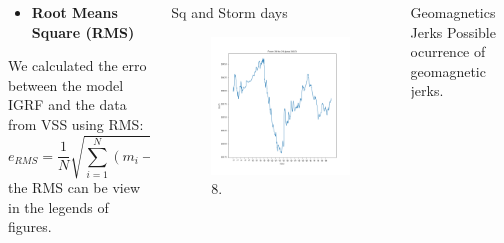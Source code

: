 \documentclass[final,t]{beamer}
\begin{document}
\begin{columns}[t]
\begin{column}{.66\linewidth}
\begin{columns}
\begin{column}{.31\linewidth}
\begin{block}{}
\begin{itemize}
\justifying
		\item \bf{Root Means Square (RMS)}
\end{itemize}
We calculated the erro between the model IGRF and the data from VSS using RMS:
\[e_{RMS}=\frac{1}{N} \sqrt{\sum\limits_{i=1}^{N}(m_{i}-d_{i})^{2}}, 
\]
the RMS can be view in the legends of figures.
 
	
\end{block}	


\end{column}
\begin{column}{.31\linewidth}


\begin{block}{Sq and Storm days}
	\justifying
\begin{figure}
	\centering
	\includegraphics[width=0.6\linewidth]{28_29_june(2013)}
	\caption{8.}
	\label{storm}
\end{figure}	
	
\end{block}	
	

\end{column}


\begin{column}{.31\linewidth}
	
	
	\begin{block}{Geomagnetics Jerks}
		\justifying
		Possible ocurrence of geomagnetic jerks.
		

\end{block}
\end{column}
\end{columns}
\end{column}
\end{columns}
\end{document}

